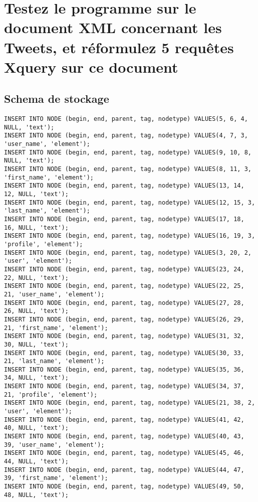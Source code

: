 \section{Testez le programme sur le document XML concernant les Tweets, et réformulez 5 requêtes Xquery sur ce document}
\subsection{Schema de stockage}
\begin{verbatim}
INSERT INTO NODE (begin, end, parent, tag, nodetype) VALUES(5, 6, 4, NULL, 'text');
INSERT INTO NODE (begin, end, parent, tag, nodetype) VALUES(4, 7, 3, 'user_name', 'element');
INSERT INTO NODE (begin, end, parent, tag, nodetype) VALUES(9, 10, 8, NULL, 'text');
INSERT INTO NODE (begin, end, parent, tag, nodetype) VALUES(8, 11, 3, 'first_name', 'element');
INSERT INTO NODE (begin, end, parent, tag, nodetype) VALUES(13, 14, 12, NULL, 'text');
INSERT INTO NODE (begin, end, parent, tag, nodetype) VALUES(12, 15, 3, 'last_name', 'element');
INSERT INTO NODE (begin, end, parent, tag, nodetype) VALUES(17, 18, 16, NULL, 'text');
INSERT INTO NODE (begin, end, parent, tag, nodetype) VALUES(16, 19, 3, 'profile', 'element');
INSERT INTO NODE (begin, end, parent, tag, nodetype) VALUES(3, 20, 2, 'user', 'element');
INSERT INTO NODE (begin, end, parent, tag, nodetype) VALUES(23, 24, 22, NULL, 'text');
INSERT INTO NODE (begin, end, parent, tag, nodetype) VALUES(22, 25, 21, 'user_name', 'element');
INSERT INTO NODE (begin, end, parent, tag, nodetype) VALUES(27, 28, 26, NULL, 'text');
INSERT INTO NODE (begin, end, parent, tag, nodetype) VALUES(26, 29, 21, 'first_name', 'element');
INSERT INTO NODE (begin, end, parent, tag, nodetype) VALUES(31, 32, 30, NULL, 'text');
INSERT INTO NODE (begin, end, parent, tag, nodetype) VALUES(30, 33, 21, 'last_name', 'element');
INSERT INTO NODE (begin, end, parent, tag, nodetype) VALUES(35, 36, 34, NULL, 'text');
INSERT INTO NODE (begin, end, parent, tag, nodetype) VALUES(34, 37, 21, 'profile', 'element');
INSERT INTO NODE (begin, end, parent, tag, nodetype) VALUES(21, 38, 2, 'user', 'element');
INSERT INTO NODE (begin, end, parent, tag, nodetype) VALUES(41, 42, 40, NULL, 'text');
INSERT INTO NODE (begin, end, parent, tag, nodetype) VALUES(40, 43, 39, 'user_name', 'element');
INSERT INTO NODE (begin, end, parent, tag, nodetype) VALUES(45, 46, 44, NULL, 'text');
INSERT INTO NODE (begin, end, parent, tag, nodetype) VALUES(44, 47, 39, 'first_name', 'element');
INSERT INTO NODE (begin, end, parent, tag, nodetype) VALUES(49, 50, 48, NULL, 'text');

\end{verbatim}
